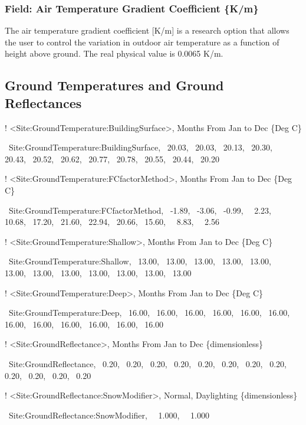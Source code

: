 \subsubsection{Field: Air Temperature Gradient Coefficient \{K/m\}}\label{field-air-temperature-gradient-coefficient-km}

The air temperature gradient coefficient {[}K/m{]} is a research option that allows the user to control the variation in outdoor air temperature as a function of height above ground. The real physical value is 0.0065 K/m.

\subsection{Ground Temperatures and Ground Reflectances}\label{ground-temperatures-and-ground-reflectances}

! \textless{}Site:GroundTemperature:BuildingSurface\textgreater{}, Months From Jan to Dec \{Deg C\}

~Site:GroundTemperature:BuildingSurface,~ 20.03,~ 20.03,~ 20.13,~ 20.30,~ 20.43,~ 20.52,~ 20.62,~ 20.77,~ 20.78,~ 20.55,~ 20.44,~ 20.20

! \textless{}Site:GroundTemperature:FCfactorMethod\textgreater{}, Months From Jan to Dec \{Deg C\}

~Site:GroundTemperature:FCfactorMethod,~ -1.89,~ -3.06,~ -0.99,~~ 2.23,~ 10.68,~ 17.20,~ 21.60,~ 22.94,~ 20.66,~ 15.60,~~ 8.83,~~ 2.56

! \textless{}Site:GroundTemperature:Shallow\textgreater{}, Months From Jan to Dec \{Deg C\}

~Site:GroundTemperature:Shallow,~ 13.00,~ 13.00,~ 13.00,~ 13.00,~ 13.00,~ 13.00,~ 13.00,~ 13.00,~ 13.00,~ 13.00,~ 13.00,~ 13.00

! \textless{}Site:GroundTemperature:Deep\textgreater{}, Months From Jan to Dec \{Deg C\}

~Site:GroundTemperature:Deep,~ 16.00,~ 16.00,~ 16.00,~ 16.00,~ 16.00,~ 16.00,~ 16.00,~ 16.00,~ 16.00,~ 16.00,~ 16.00,~ 16.00

! \textless{}Site:GroundReflectance\textgreater{}, Months From Jan to Dec \{dimensionless\}

~Site:GroundReflectance,~ 0.20,~ 0.20,~ 0.20,~ 0.20,~ 0.20,~ 0.20,~ 0.20,~ 0.20,~ 0.20,~ 0.20,~ 0.20,~ 0.20

! \textless{}Site:GroundReflectance:SnowModifier\textgreater{}, Normal, Daylighting \{dimensionless\}

~Site:GroundReflectance:SnowModifier,~~ 1.000,~~ 1.000

